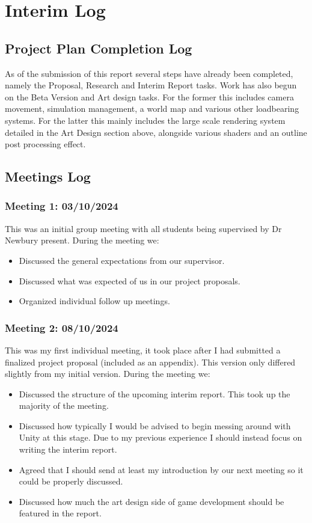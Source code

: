 \documentclass{report}
\begin{document}
\chapter{Interim Log}

\section{Project Plan Completion Log}

As of the submission of this report several steps have already been completed, namely the Proposal, Research and Interim Report tasks. Work has also begun on the Beta Version and Art design tasks. For the former this includes camera movement, simulation management, a world map and various other loadbearing systems. For the latter this mainly includes the large scale rendering system detailed in the Art Design section above, alongside various shaders and an outline post processing effect.

\section{Meetings Log}

\subsection{Meeting 1: 03/10/2024}

This was an initial group meeting with all students being supervised by Dr Newbury present. During the meeting we:
\begin{itemize}
  \item Discussed the general expectations from our supervisor. 
  \item Discussed what was expected of us in our project proposals. 
  \item Organized individual follow up meetings. 
\end{itemize}

\subsection{Meeting 2: 08/10/2024}

This was my first individual meeting, it took place after I had submitted a finalized project proposal (included as an appendix). This version only differed slightly from my initial version. During the meeting we:
\begin{itemize}
  \item Discussed the structure of the upcoming interim report. This took up the majority of the meeting.
  \item Discussed how typically I would be advised to begin messing around with Unity at this stage. Due to my previous experience I should instead focus on writing the interim report. 
  \item Agreed that I should send at least my introduction by our next meeting so it could be properly discussed.
  \item Discussed how much the art design side of game development should be featured in the report.
\end{itemize}
\end{document}
